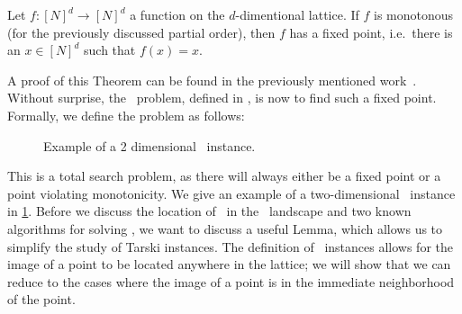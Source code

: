 \begin{theorem}
    Let $f : {[N]}^d \rightarrow {[N]}^d$ a function on the $d$-dimentional lattice. If $f$ is monotonous (for the previously discussed partial order), then $f$ has a fixed point, i.e.\ there is an $x \in {[N]}^d$ such that $f(x)=x$.
\end{theorem}

A proof of this Theorem can be found in the previously mentioned work~\cite{tarski_lattice-theoretical_1955}. Without surprise, the \Tarski\ problem, defined in , is now to find such a fixed point. Formally, we define the problem as follows:

\begin{figure}
    \centering
    \caption[Example of a \Tarski\ instance]{Example of a 2 dimensional \Tarski\ instance.}
    \label{fig:tarski_example}
\end{figure}

This is a total search problem, as there will always either be a fixed point or a point violating monotonicity. We give an example of a two-dimensional \Tarski\ instance in \cref{fig:tarski_example}. Before we discuss the location of \Tarski\ in the \TFNP\ landscape and two known algorithms for solving \Tarski, we want to discuss a useful Lemma, which allows us to simplify the study of Tarski instances. The definition of \Tarski\ instances allows for the image of a point to be located anywhere in the lattice; we will show that we can reduce to the cases where the image of a point is in the immediate neighborhood of the point.

